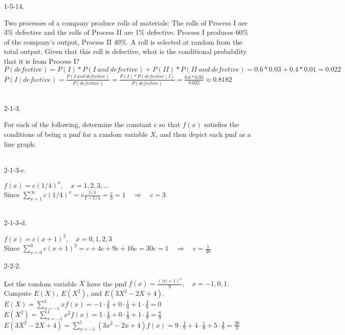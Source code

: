 \documentclass[12pt]{book}
\begin{document}
\begin{CJK}{UTF8}{bsmi}
1-5-14. \begin{minipage}[t]{\dimexpr\linewidth-2em}
Two processes of a company produce rolls of materials: The rolls of Process I are 3\% defective and the rolls of Process II are 1\% defective. Process I produces 60\% of the company’s output, Process II 40\%. A roll is selected at random from the total output. Given that this roll is defective, what is the conditional probability that it is from Process I? \\
$\displaystyle P(defective)=P(I)*P(I\ and\ defective)+P(II)*P(II\ and\ defective)=0.6*0.03+0.4*0.01=0.022$ \\
$\displaystyle P(I\mid defective)=\frac{P(I\ and\ defective)}{P(defective)}=\frac{P(I)*P(defective\mid I)}{P(defective)}=\frac{0.6*0.03}{0.022}\approx0.8182$
\end{minipage}\\

2-1-3. \begin{minipage}[t]{\dimexpr\linewidth-2em}
For each of the following, determine the constant $c$ so that $f(x)$ satisfies the conditions of being a pmf for a random variable $X$, and then depict each pmf as a line graph:
\end{minipage}\\

2-1-3-c. \begin{minipage}[t]{\dimexpr\linewidth-2em}
$f(x)=c(1/4)^x,\quad x=1,2,3,...$ \\
Since $\displaystyle\sum_{x=1}^\infty c(1/4)^x=c\frac{1/4}{1-1/4}=\frac{c}{3}=1\quad\Rightarrow\quad c=3$
\end{minipage}\\

2-1-3-d. \begin{minipage}[t]{\dimexpr\linewidth-2em}
$f(x)=c(x+1)^2,\quad x=0,1,2,3$ \\
Since $\displaystyle\sum_{x=0}^3 c(x+1)^2=c+4c+9c+16c=30c=1\quad\Rightarrow\quad c=\frac{1}{30}$
\end{minipage}
\begin{figure}[H] 
\centering 
{}
\centering 
{}
\end{figure}

2-2-2. \begin{minipage}[t]{\dimexpr\linewidth-2em}
Let the random variable $X$ have the pmf $\displaystyle f(x)=\frac{(|x|+1)^2}{9},\quad x=-1,0,1$. \\
Compute $E(X),\ E(X^2)$, and $E(3X^2-2X+4)$. \\
$\displaystyle E(X)=\sum_{x=-1}^1 xf(x)=-1\cdot\frac{4}{9}+0\cdot\frac{1}{9}+1\cdot\frac{4}{9}=0$ \\
$\displaystyle E(X^2)=\sum_{x=-1}^1x^2f(x)=1\cdot\frac{4}{9}+0\cdot\frac{1}{9}+1\cdot\frac{4}{9}=\frac{8}{9}$ \\
$\displaystyle E(3X^2-2X+4)=\sum_{x=-1}^1(3x^2-2x+4)f(x)=9\cdot\frac{4}{9}+4\cdot\frac{1}{9}+5\cdot\frac{4}{9}=\frac{20}{3}$ \\
\end{minipage}\\


\end{CJK}
\end{document}
